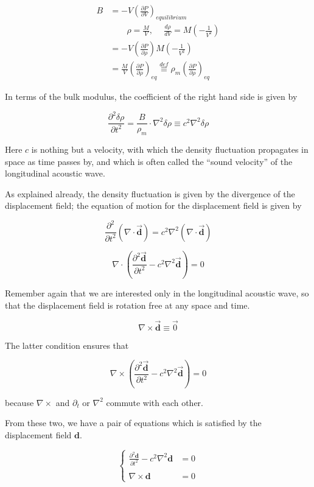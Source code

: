 \[\begin{split}
B &= -V\left(\frac{\partial P}{\partial V}\right)_{equilibrium}\\
&\quad\quad \rho = \frac{M}{V},\ \quad \frac{d\rho}{dV} = M\left(-\frac{1}{V^2}\right)\\
&= -V\left(\frac{\partial P}{\partial\rho}\right)M\left(-\frac{1}{V^2}\right)\\ &= \frac{M}{V}\left(\frac{\partial P}{\partial \rho}\right)_{eq} \overset{def}{\equiv}\rho_m\left(\frac{\partial P}{\partial\rho}\right)_{eq}
\end{split} \]

In terms of the bulk modulus, the coefficient of the right hand side is given by

\[\frac{\partial^2\delta\rho}{\partial t^2} = \frac{B}{\rho_m}\cdot\nabla^2\delta\rho \equiv c^2\nabla^2\delta\rho \]

Here $c$ is nothing but a velocity, with which the density fluctuation propagates in space as time passes by, and which is often called the ``sound velocity'' of the longitudinal acoustic wave.

As explained already, the density fluctuation is given by the divergence of the displacement field; the equation of motion for the displacement field is given by

\[\frac{\partial^2}{\partial t^2}(\nabla\cdot\vec{\bm{d}}) = c^2\nabla^2(\nabla\cdot\vec{\bm{d}}) \]

\[\nabla\cdot\left(\frac{\partial^2 \vec{\bm{d}}}{\partial t^2} - c^2\nabla^2\vec{\bm{d}}\right) = 0 \]

Remember again that we are interested only in the longitudinal acoustic wave, so that the displacement field is rotation free at any space and time.

\[\nabla\times\vec{\bm{d}} \equiv\vec{0} \]

The latter condition ensures that

\[\nabla\times\left(\frac{\partial^2 \vec{\bm{d}}}{\partial t^2} - c^2\nabla^2\vec{\bm{d}}\right) = 0\]

because $\nabla\times$ and $\partial_t$ or $\nabla^2$ commute with each other.

From these two, we have a pair of equations which is satisfied by the displacement field $\bm{d}$.

\[\begin{cases}
\frac{\partial^2\bm{d}}{\partial t^2} - c^2\nabla^2\bm{d} &= 0\\
\ &\ \\
\nabla\times\bm{d} &= 0
\end{cases}\]

